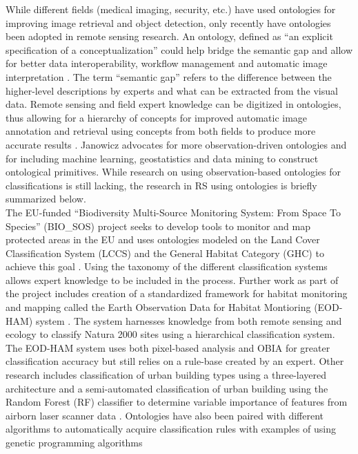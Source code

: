 \documentclass[authoryear, review,12pt,number]{elsarticle}
\begin{document}
While different fields (medical imaging, security, etc.) have used ontologies for
improving image retrieval and object detection, only recently have ontologies
been adopted in remote sensing research. An ontology, defined as ``an explicit
specification of a conceptualization'' \citep{gruber1993} could help bridge the
semantic gap and allow for better data interoperability, workflow management and
automatic image interpretation \citep{Arvor2013, Andres2013a}. The term
``semantic gap'' refers to the difference between the higher-level descriptions
by experts and what can be extracted from the visual data. Remote sensing and
field expert knowledge can be digitized in ontologies, thus allowing for a
hierarchy of concepts for improved automatic image annotation and retrieval
using concepts from both fields to produce more accurate results
\cite{Srikanth:2005:EOA:1076034.1076128}. Janowicz \cite{Janowicz2012}
advocates for more observation-driven ontologies and for including machine
learning, geostatistics and data mining to construct ontological primitives.
While research on using observation-based ontologies for classifications is
still lacking, the research in RS using ontologies is briefly summarized below.
\\
The EU-funded  ``Biodiversity Multi-Source Monitoring System: From Space To
Species'' (BIO\_SOS) project seeks to develop tools to monitor and map protected
areas in the EU and uses ontologies modeled on the Land Cover Classification
System (LCCS) and the General Habitat Category (GHC) to achieve this goal
\citep{Arvor2013}.  Using the taxonomy of the different classification systems
allows expert knowledge to be included in the process. Further work as part of
the project includes creation of a standardized framework for habitat
monitoring and mapping called the Earth Observation Data for Habitat Montioring
(EOD-HAM) system \citep{Lucas2015}. The system harnesses knowledge from both
remote sensing and ecology to classify Natura 2000 sites using a hierarchical
classification system. The EOD-HAM system uses both pixel-based analysis and
OBIA for greater classification accuracy but still relies on a rule-base
created by an expert. Other research includes classification of urban building
types using a three-layered architecture \citep{diSciascio2013} and 
a semi-automated classification of urban building using the Random Forest (RF)
classifier to determine variable importance of features from airborn laser
scanner data \citep{Belgiu2014}. Ontologies have also
been paired with different algorithms to
automatically acquire classification rules with examples of using genetic programming algorithms 
\end{document}
